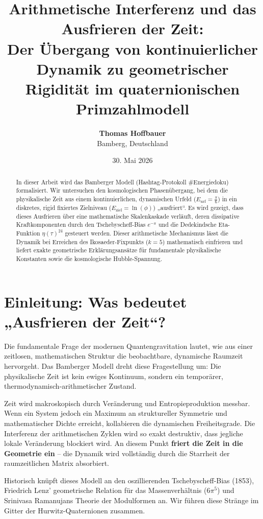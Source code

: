 \documentclass[11pt,a4paper]{article}
\title{\textbf{Arithmetische Interferenz und das Ausfrieren der Zeit:\\Der Übergang von kontinuierlicher Dynamik zu geometrischer Rigidität im quaternionischen Primzahlmodell}}
\author{\textbf{Thomas Hoffbauer} \\ Bamberg, Deutschland}
\date{30. Mai 2026}
\begin{document}
\maketitle

\begin{abstract}
In dieser Arbeit wird das Bamberger Modell (Hashtag-Protokoll \#Energiedoku) formalisiert. Wir untersuchen den kosmologischen Phasenübergang, bei dem die physikalische Zeit aus einem kontinuierlichen, dynamischen Urfeld ($E_{\text{urf}} = \frac{\pi}{6}$) in ein diskretes, rigid fixiertes Zielniveau ($E_{\text{ziel}} = \ln(\phi)$) „ausfriert“. Es wird gezeigt, dass dieses Ausfrieren über eine mathematische Skalenkaskade verläuft, deren dissipative Kraftkomponenten durch den Tschebyscheff-Bias $e^{-\pi}$ und die Dedekindsche Eta-Funktion $\eta(\tau)^{24}$ gesteuert werden. Dieser arithmetische Mechanismus lässt die Dynamik bei Erreichen des Ikosaeder-Fixpunkts ($k=5$) mathematisch einfrieren und liefert exakte geometrische Erklärungsansätze für fundamentale physikalische Konstanten sowie die kosmologische Hubble-Spannung.
\end{abstract}

\section{Einleitung: Was bedeutet „Ausfrieren der Zeit“?}
Die fundamentale Frage der modernen Quantengravitation lautet, wie aus einer zeitlosen, mathematischen Struktur die beobachtbare, dynamische Raumzeit hervorgeht. Das Bamberger Modell dreht diese Fragestellung um: Die physikalische Zeit ist kein ewiges Kontinuum, sondern ein temporärer, thermodynamisch-arithmetischer Zustand.

Zeit wird makroskopisch durch Veränderung und Entropieproduktion messbar. Wenn ein System jedoch ein Maximum an struktureller Symmetrie und mathematischer Dichte erreicht, kollabieren die dynamischen Freiheitsgrade. Die Interferenz der arithmetischen Zyklen wird so exakt destruktiv, dass jegliche lokale Veränderung blockiert wird. An diesem Punkt \textbf{friert die Zeit in die Geometrie ein} -- die Dynamik wird vollständig durch die Starrheit der raumzeitlichen Matrix absorbiert.

Historisch knüpft dieses Modell an den oszillierenden Tschebyscheff-Bias (1853), Friedrich Lenz’ geometrische Relation für das Massenverhältnis ($6\pi^5$) und Srinivasa Ramanujans Theorie der Modulformen an. Wir führen diese Stränge im Gitter der Hurwitz-Quaternionen zusammen.
\end{document}
